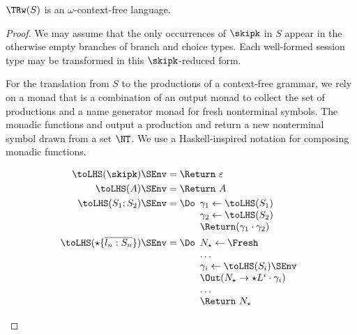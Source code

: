 \clearpage

\begin{theorem}\label{theorem:tr-is-w-CFL}
  $\TRw (S)$ is an $\omega$-context-free language.
\end{theorem}
\begin{proof}
  We may assume that the only occurrences of $\skipk$ in $S$ appear in the otherwise empty branches
  of branch and choice types. Each well-formed session type may be transformed in this $\skipk$-reduced form.

  For the translation from $S$ to the productions of a context-free grammar, we rely on a monad that
  is a combination of an output monad to collect the set of productions and a name generator monad
  for fresh nonterminal symbols. The monadic functions \Out{} and \Fresh{} output a production and
  return a new nonterminal symbol drawn from a set $\NT$. We use a Haskell-inspired \Do{} notation
  for composing monadic functions.
  \begin{figure}[tp]
    \begin{align*}
      \toLHS (\skipk)\SEnv & = \Return\ \varepsilon \\
      \toLHS (A)\SEnv & = \Return\ A \\
      \toLHS (S_1; S_2)\SEnv & = \Do
                              \begin{array}[t]{l}
                                \gamma_1 \gets \toLHS (S_1) \\
                                \gamma_2 \gets \toLHS (S_2) \\
                                \Return (\gamma_1\cdot\gamma_2)
                              \end{array}
      \\
      \toLHS (\star\{\overline{l_n:S_n}\})\SEnv &= \Do
                                                 \begin{array}[t]{l}
                                                   N_\star \gets \Fresh \\
                                                   \dots \\
                                                   \gamma_i \gets \toLHS (S_i)\SEnv \\
                                                   \Out (N_\star \to \star L^i \cdot \gamma_i) \\
                                                   \dots \\
                                                   \Return\ N_\star

\end{array}
\end{align*}
\end{figure}
\end{proof}
